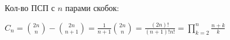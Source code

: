 Кол-во ПСП с $n$ парами скобок:

$C_n=\binom{2n}n-\binom{2n}{n+1}=\frac1{n+1}\binom{2n}n=\frac{(2n)!}{(n+1)!n!}=\prod\limits_{k=2}^n\frac{n+k}{k}$
